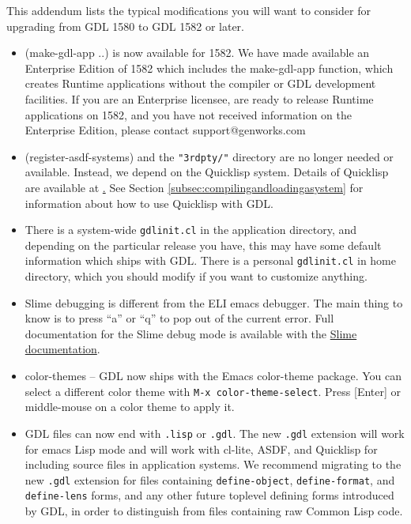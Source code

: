 \documentclass [11pt]{book}
\begin{document}
This addendum lists the typical modifications you will want to
consider for upgrading from GDL 1580 to GDL 1582 or later.

\begin{itemize}

\item (make-gdl-app ..) is now available for 1582. We have
made available an Enterprise Edition of 1582 which includes the
make-gdl-app function, which creates Runtime applications without the
compiler or GDL development facilities.  If you are an Enterprise
licensee, are ready to release Runtime applications on 1582, and you
have not received information on the Enterprise Edition, please
contact support@genworks.com

\item (register-asdf-systems) and the \texttt{"3rdpty/"} directory are no longer needed or available. Instead, we depend on the Quicklisp
system. Details of Quicklisp are available at \href{http://www.quicklisp.org}. See Section 
\ref{subsec:compilingandloadingasystem} for information about how to use Quicklisp with GDL.

\item There is a system-wide \texttt{gdlinit.cl} in the application directory, and depending on the
       particular release you have, this may have some default
       information which ships with GDL. There is a personal \texttt{gdlinit.cl} in home directory, which you should modify if you want to
       customize anything.

\item Slime debugging is different from the ELI emacs debugger. The main thing to know is 
to press ``a'' or ``q'' to pop out of the current error. Full documentation for the Slime debug mode
is available with the \href{http://common-lisp.net/project/slime/doc/html/Debugger.html}{Slime documentation}.

\item color-themes -- GDL now ships with the Emacs
       color-theme package. You can select a different color theme with \texttt{M-x color-theme-select}. Press [Enter] or middle-mouse on a color theme to apply it.

\item GDL files can now end with \texttt{.lisp} or \texttt{.gdl}. The new \texttt{.gdl} extension will work for emacs Lisp mode and will work with
	 cl-lite, ASDF, and Quicklisp for including source files in application systems. We recommend migrating
to the new \texttt{.gdl} extension for files containing \texttt{define-object}, \texttt{define-format}, and \texttt{define-lens} forms, and any other future toplevel defining forms introduced by GDL, in order to distinguish 
from files containing raw Common Lisp code.


\end{itemize}
\end{document}
